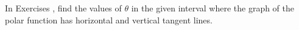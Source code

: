 {\noindent In Exercises}
{, find the values of $\theta$ in the given interval where the graph of the polar function has horizontal and vertical tangent lines.
}
